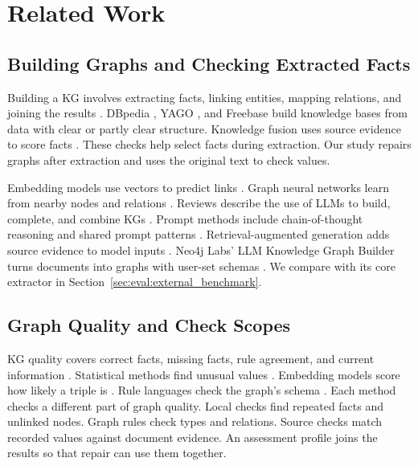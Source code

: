 \section{Related Work}
\label{sec:related_work}

\subsection{Building Graphs and Checking Extracted Facts}

Building a KG involves extracting facts, linking entities, mapping relations,
and joining the results \citep{ref_ji2021}. DBpedia \citep{ref_auer2007},
YAGO \citep{ref_suchanek2007}, and Freebase \citep{ref_bollacker2008} build
knowledge bases from data with clear or partly clear structure.
Knowledge fusion uses source evidence to score facts \citep{ref_dong2014}.
These checks help select facts during extraction.
Our study repairs graphs after extraction and uses the original text to check values.

Embedding models use vectors to predict links
\citep{ref_bordes2013,ref_wang2017}. Graph neural networks learn from nearby
nodes and relations \citep{ref_schlichtkrull2018}. Reviews describe the use
of LLMs to build, complete, and combine KGs
\citep{ref_pan2023,ref_pan2025,ref_bian2025}. Prompt methods include
chain-of-thought reasoning \citep{ref_wei2023} and shared prompt patterns
\citep{ref_white2023}. Retrieval-augmented generation adds source evidence
to model inputs \citep{ref_lewis2020}. Neo4j Labs' LLM Knowledge Graph
Builder turns documents into graphs with user-set schemas
\citep{ref_neo4j_llm_graph_builder}. We compare with its core extractor in
Section~\ref{sec:eval:external_benchmark}.

\subsection{Graph Quality and Check Scopes}

KG quality covers correct facts, missing facts, rule agreement, and current
information \citep{ref_zaveri2016,ref_paulheim2017}. Statistical methods
find unusual values \citep{ref_wienand2014,ref_paulheim2014}.
Embedding models score how likely a triple is \citep{ref_nickel2016}.
Rule languages check the graph's schema \citep{ref_kontokostas2014}.
Each method checks a different part of graph quality.
Local checks find repeated facts and unlinked nodes.
Graph rules check types and relations.
Source checks match recorded values against document evidence.
An assessment profile joins the results so that repair can use them together.

